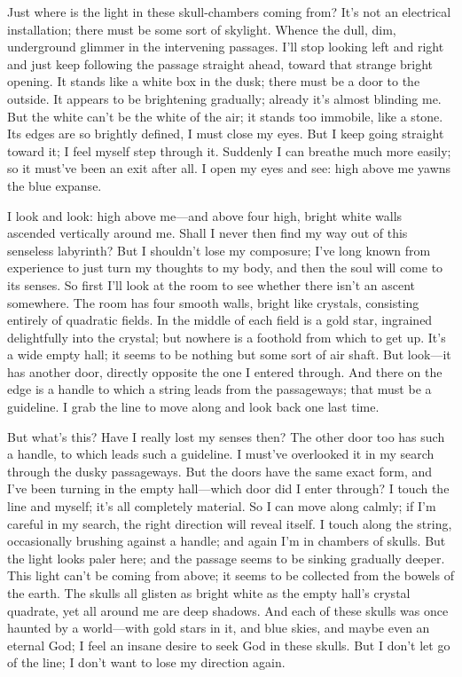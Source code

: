 \documentclass[12pt,a4paper]{article}
\begin{document}
Just where is the light in these skull-chambers coming from? It’s not an electrical installation; there must be some sort of skylight. Whence the dull, dim, underground glimmer in the intervening passages. I’ll stop looking left and right and just keep following the passage straight ahead, toward that strange bright opening. It stands like a white box in the dusk; there must be a door to the outside. It appears to be brightening gradually; already it’s almost blinding me. But the white can’t be the white of the air; it stands too immobile, like a stone. Its edges are so brightly defined, I must close my eyes. But I keep going straight toward it; I feel myself step through it. Suddenly I can breathe much more easily; so it must’ve been an exit after all. I open my eyes and see: high above me yawns the blue expanse.

I look and look: high above me—and above four high, bright white walls ascended vertically around me. Shall I never then find my way out of this senseless labyrinth? But I shouldn’t lose my composure; I’ve long known from experience to just turn my thoughts to my body, and then the soul will come to its senses. So first I’ll look at the room to see whether there isn’t an ascent somewhere. The room has four smooth walls, bright like crystals, consisting entirely of quadratic fields. In the middle of each field is a gold star, ingrained delightfully into the crystal; but nowhere is a foothold from which to get up. It’s a wide empty hall; it seems to be nothing but some sort of air shaft. But look—it has another door, directly opposite the one I entered through. And there on the edge is a handle to which a string leads from the passageways; that must be a guideline. I grab the line to move along and look back one last time.

But what’s this? Have I really lost my senses then? The other door too has such a handle, to which leads such a guideline. I must’ve overlooked it in my search through the dusky passageways. But the doors have the same exact form, and I’ve been turning in the empty hall—which door did I enter through? I touch the line and myself; it’s all completely material. So I can move along calmly; if I’m careful in my search, the right direction will reveal itself. I touch along the string, occasionally brushing against a handle; and again I’m in chambers of skulls. But the light looks paler here; and the passage seems to be sinking gradually deeper. This light can’t be coming from above; it seems to be collected from the bowels of the earth. The skulls all glisten as bright white as the empty hall’s crystal quadrate, yet all around me are deep shadows. And each of these skulls was once haunted by a world—with gold stars in it, and blue skies, and maybe even an eternal God; I feel an insane desire to seek God in these skulls. But I don’t let go of the line; I don’t want to lose my direction again.
\end{document}
